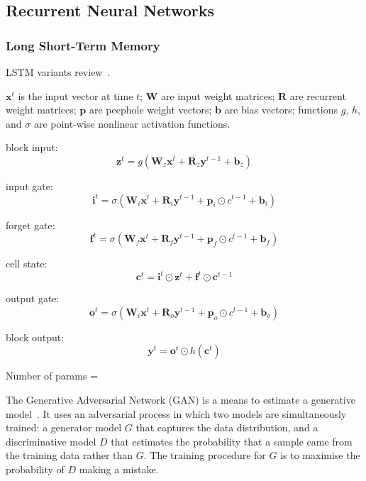 \subsection{Recurrent Neural Networks}


\subsubsection{Long Short-Term Memory}

LSTM variants review~\cite{Greff2015}.

$\bm{x}^t$ is the input vector at time $t$; $\bm{W}$ are input weight matrices; $\bm{R}$ are recurrent weight matrices; $\bm{p}$ are peephole weight vectors; $\bm{b}$ are bias vectors; functions $g$, $h$, and $\sigma$ are point-wise nonlinear activation functions.

block input:
\[ \bm{z}^{t} = g \left( \bm{W}_z \bm{x}^t + \bm{R}_z \bm{y}^{t - 1} + \bm{b}_z \right) \]

input gate:
\[ \bm{i}^{t} = \sigma \left( \bm{W}_i \bm{x}^t + \bm{R}_i \bm{y}^{t-1} + \bm{p}_i \odot c^{t-1} + \bm{b}_i \right) \]

forget gate:
\[ \bm{f}^{t} = \sigma \left( \bm{W}_f \bm{x}^t + \bm{R}_f \bm{y}^{t-1} + \bm{p}_f \odot c^{t-1} + \bm{b}_f \right) \]

cell state:
\[ \bm{c}^t = \bm{i}^t \odot \bm{z}^t + \bm{f}^t \odot \bm{c}^{t-1} \]

output gate:
\[ \bm{o}^{t} = \sigma \left( \bm{W}_i \bm{x}^t + \bm{R}_o \bm{y}^{t - 1} + \bm{p}_o \odot c^{t-1} + \bm{b}_o \right) \]

block output:
\[ \bm{y}^t = \bm{o}^t \odot h(\bm{c}^t) \]

Number of params = \todo[inline]{\ldots}



The Generative Adversarial Network (GAN) is a means to estimate a generative model~\cite{Goodfellow2014}. It uses an adversarial process in which two models are simultaneously trained: a generator model $G$ that captures the data distribution, and a discriminative model $D$ that estimates the probability that a sample came from the training data rather than $G$. The training procedure for $G$ is to maximise the probability of $D$ making a mistake.

